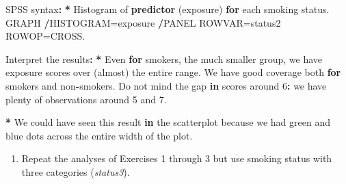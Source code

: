 \documentclass[a4paper]{book}
\newenvironment{Shaded}{\begin{snugshade}}{\end{snugshade}}
\newcommand{\KeywordTok}[1]{\textcolor[rgb]{0,0,0}{\textbf{#1}}}
\newcommand{\DecValTok}[1]{\textcolor[rgb]{0.00,0.00,0.00}{#1}}
\newcommand{\StringTok}[1]{\textcolor[rgb]{0.00,0.00,0.00}{#1}}
\newcommand{\ControlFlowTok}[1]{\textcolor[rgb]{0.00,0.00,0.00}{\textbf{#1}}}
\newcommand{\OperatorTok}[1]{\textcolor[rgb]{0.00,0.00,0.00}{\textbf{#1}}}
\newcommand{\ErrorTok}[1]{\textcolor[rgb]{0.00,0.00,0.00}{\textbf{#1}}}
\newcommand{\NormalTok}[1]{#1}
\providecommand{\tightlist}{%
  \setlength{\itemsep}{0pt}\setlength{\parskip}{0pt}}
\theoremstyle{definition}
\theoremstyle{definition}
\theoremstyle{definition}
\theoremstyle{remark}
\begin{document}
\begin{Shaded}
\begin{Highlighting}[]
\NormalTok{SPSS syntax}\OperatorTok{:}\StringTok{  }
\StringTok{  }
\ErrorTok{*}\StringTok{ }\NormalTok{Histogram of }\KeywordTok{predictor}\NormalTok{ (exposure) }\ControlFlowTok{for}\NormalTok{ each smoking status.  }
\NormalTok{GRAPH  }
  \OperatorTok{/}\NormalTok{HISTOGRAM=exposure  }
  \OperatorTok{/}\NormalTok{PANEL ROWVAR=status2 ROWOP=CROSS.  }
  
\NormalTok{Interpret the results}\OperatorTok{:}\StringTok{  }
\StringTok{  }
\ErrorTok{*}\StringTok{ }\NormalTok{Even }\ControlFlowTok{for}\NormalTok{ smokers, the much smaller group, we have exposure scores over}
\NormalTok{(almost) the entire range. We have good coverage both }\ControlFlowTok{for}\NormalTok{ smokers and}
\NormalTok{non}\OperatorTok{-}\NormalTok{smokers. Do not mind the gap }\ControlFlowTok{in}\NormalTok{ scores around }\DecValTok{6}\OperatorTok{:}\StringTok{ }\NormalTok{we have plenty of}
\NormalTok{observations around }\DecValTok{5}\NormalTok{ and }\DecValTok{7}\NormalTok{.}
  
\OperatorTok{*}\StringTok{ }\NormalTok{We could have seen this result }\ControlFlowTok{in}\NormalTok{ the scatterplot because we had green and}
\NormalTok{blue dots across the entire width of the plot.}
\end{Highlighting}
\end{Shaded}

\begin{enumerate}
\def\labelenumi{\arabic{enumi}.}
\setcounter{enumi}{3}
\tightlist
\item
  Repeat the analyses of Exercises 1 through 3 but use smoking status
  with three categories (\emph{status3}).
\end{enumerate}
\end{document}
